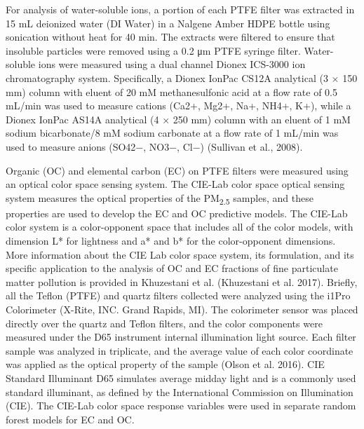 \documentclass[
  letterpaper,
  DIV=11,
  numbers=noendperiod]{scrartcl}
\begin{document}
For analysis of water-soluble ions, a portion of each PTFE filter was
extracted in 15 mL deionized water (DI Water) in a Nalgene Amber HDPE
bottle using sonication without heat for 40 min. The extracts were
filtered to ensure that insoluble particles were removed using a 0.2 μm
PTFE syringe filter. Water-soluble ions were measured using a dual
channel Dionex ICS-3000 ion chromatography system. Specifically, a
Dionex IonPac CS12A analytical (3 × 150 mm) column with eluent of 20 mM
methanesulfonic acid at a flow rate of 0.5 mL/min was used to measure
cations (Ca2+, Mg2+, Na+, NH4+, K+), while a Dionex IonPac AS14A
analytical (4 × 250 mm) column with an eluent of 1 mM sodium
bicarbonate/8 mM sodium carbonate at a flow rate of 1 mL/min was used to
measure anions (SO42−, NO3−, Cl−) (Sullivan et al., 2008).

Organic (OC) and elemental carbon (EC) on PTFE filters were measured
using an optical color space sensing system. The CIE-Lab color space
optical sensing system measures the optical properties of the
PM\textsubscript{2.5} samples, and these properties are used to develop
the EC and OC predictive models. The CIE-Lab color system is a
color-opponent space that includes all of the color models, with
dimension L* for lightness and a* and b* for the color-opponent
dimensions. More information about the CIE Lab color space system, its
formulation, and its specific application to the analysis of OC and EC
fractions of fine particulate matter pollution is provided in Khuzestani
et al. (Khuzestani et al. 2017). Briefly, all the Teflon (PTFE) and
quartz filters collected were analyzed using the i1Pro Colorimeter
(X-Rite, INC. Grand Rapids, MI). The colorimeter sensor was placed
directly over the quartz and Teflon filters, and the color components
were measured under the D65 instrument internal illumination light
source. Each filter sample was analyzed in triplicate, and the average
value of each color coordinate was applied as the optical property of
the sample (Olson et al. 2016). CIE Standard Illuminant D65 simulates
average midday light and is a commonly used standard illuminant, as
defined by the International Commission on Illumination (CIE). The
CIE-Lab color space response variables were used in separate random
forest models for EC and OC.
\end{document}
